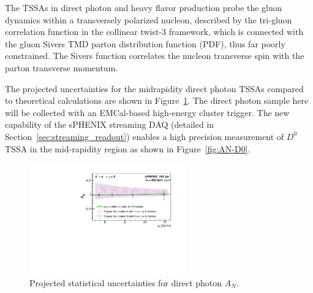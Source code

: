 The TSSAs in direct photon and heavy flavor production probe the gluon
dynamics within a transversely polarized nucleon, described by the
tri-gluon correlation function in the collinear twist-3 framework,
which is connected with the gluon Sivers TMD parton distribution
function (PDF), thus far poorly constrained. The Sivers function
correlates the nucleon transverse spin with the parton transverse
momentum. 

The projected uncertainties for the midrapidity direct photon TSSAs compared to theoretical calculations are shown in Figure~\ref{fig:AN_dp}. The direct photon sample here will be collected with an EMCal-based high-energy cluster trigger. 
The new capability of the sPHENIX streaming DAQ (detailed in
Section~\ref{sec:streaming_readout}) enables a high precision
measurement of $D^0$ TSSA in the mid-rapidity region as shown in
Figure~\ref{fig:AN-D0}.  

\begin{figure}[htbp]
\centering
\includegraphics[width=0.60\textwidth]{figs/AN_dp_sphenix.pdf}
\caption{Projected statistical uncertainties for direct photon $A_N$.}
\label{fig:AN_dp}
\end{figure}

